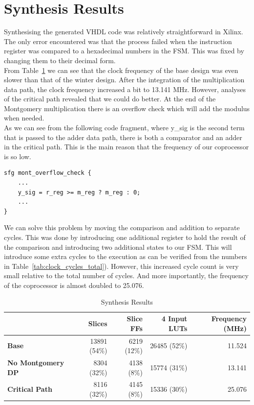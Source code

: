 \documentclass[a4paper]{article}
\begin{document}
\section{Synthesis Results}
\label{sec:synthesis_results}

Synthesising the generated VHDL code was relatively straightforward in Xilinx. The only error encountered was that the process failed when the instruction register was compared to a hexadecimal numbers in the FSM. This was fixed by changing them to their decimal form.\\

From Table~\ref{tab:synthesis_results} we can see that the clock frequency of the base design was even slower than that of the winter design. After the integration of the multiplication data path, the clock frequency increased a bit to 13.141 MHz. However, analyses of the critical path revealed that we could do better. At the end of the Montgomery multiplication there is an overflow check which will add the modulus when needed.\\

As we can see from the following code fragment, where y\_sig is the second term that is passed to the adder data path, there is both a comparator and an adder in the critical path. This is the main reason that the frequency of our coprocessor is so low.

\begin{lstlisting}
sfg mont_overflow_check {
    ...
    y_sig = r_reg >= m_reg ? m_reg : 0;
    ...
}
\end{lstlisting}

We can solve this problem by moving the comparison and addition to separate cycles. This was done by introducing one additional register to hold the result of the comparison and introducing two additional states to our FSM. This will introduce some extra cycles to the execution as can be verified from the numbers in Table~\ref{tab:clock_cycles_total}). However, this increased cycle count is very small relative to the total number of cycles. And more importantly, the frequency of the coprocessor is almost doubled to 25.076.\\

\begin{table}[H]
	\begin{center}	
		\begin{tabular}{l|r|r|r|r}
			& \textbf{Slices} & \textbf{Slice FFs} & \textbf{4 Input LUTs} & \textbf{Frequency} (MHz)\\\hline
        		\textbf{Base} & 13891 (54\%) & 6219 (12\%) & 26485 (52\%) & 11.524\\
             \textbf{No Montgomery DP} & 8304 (32\%) & 4138 (8\%) & 15774 (31\%) & 13.141\\
             \textbf{Critical Path} & 8116 (32\%) & 4145 (8\%) & 15336 (30\%) & 25.076
		\end{tabular}
	\end{center}
	\caption{Synthesis Results}
	\label{tab:synthesis_results}
\end{table}
\end{document}
